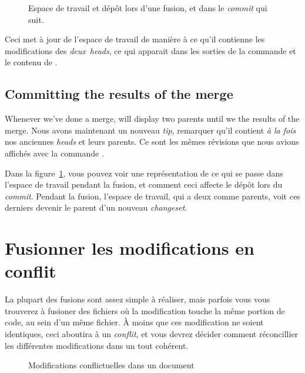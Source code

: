 \begin{figure}[ht]
  \centering
  \caption{Espace de travail et dépôt lors d'une fusion, et dans le
    \textit{commit} qui suit.}
  \label{fig:tour-merge:merge}
\end{figure}

Ceci met à jour de l'espace de travail de manière à ce qu'il contienne
les modifications des \emph{deux} \textit{heads}, ce qui apparait dans
les sorties de la commande  et le contenu de 
. 

\subsection{Committing the results of the merge}

Whenever we've done a merge,  will display two parents
until we  the results of the merge.
Nous avons maintenant un nouveau \textit{tip}, remarquer qu'il contient
\emph{à la fois} nos anciennes \textit{heads} et leurs parents. Ce sont
les mêmes révisions que nous avions affichés avec la commande 
.

Dans la figure~\ref{fig:tour-merge:merge}, vous pouvez voir une représentation
de ce qui se passe dans l'espace de travail pendant la fusion, et comment ceci
affecte le dépôt lors du \textit{commit}. Pendant la fusion, l'espace de travail,
qui a deux  comme parents, voit ces derniers devenir le parent
d'un nouveau \textit{changeset}.

\section{Fusionner les modifications en conflit}

La plupart des fusions sont assez simple à réaliser, mais parfois 
vous vous trouverez à fusioner des fichiers où la modification touche
la même portion de code, au sein d'un même fichier. À moins que ces
modification ne soient identiques, ceci aboutira à un \emph{conflit},
et vous devrez décider comment réconcillier les différentes modifications
dans un tout cohérent. 

\begin{figure}[ht]
  \centering
  \caption{Modifications conflictuelles dans un document}
  \label{fig:tour-merge:conflict}
\end{figure}

